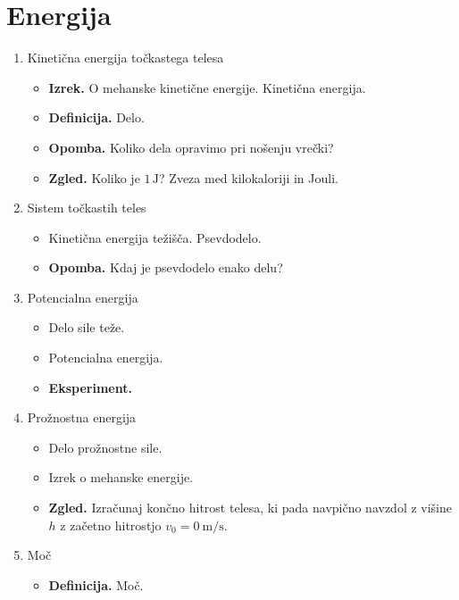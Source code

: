 \section{Energija}
\begin{enumerate}
    \item Kinetična energija točkastega telesa
    \begin{itemize}
        \item \textbf{Izrek.} O mehanske kinetične energije. Kinetična energija.
        \item \textbf{Definicija.} Delo.
        \item \textbf{Opomba.} Koliko dela opravimo pri nošenju vrečki?
        \item \textbf{Zgled.} Koliko je \(1\, \text{J}\)? Zveza med kilokaloriji in Jouli.
    \end{itemize}

    \item Sistem točkastih teles
    \begin{itemize}
        \item Kinetična energija težišča. Psevdodelo.
        \item \textbf{Opomba.} Kdaj je psevdodelo enako delu?
    \end{itemize}

    \item Potencialna energija
    \begin{itemize}
        \item Delo sile teže.
        \item Potencialna energija. 
        \item \textbf{Eksperiment.} \todo{}
    \end{itemize}

    \item Prožnostna energija
    \begin{itemize}
        \item Delo prožnostne sile.
        \item Izrek o mehanske energije.
        \item \textbf{Zgled.} Izračunaj končno hitrost telesa, ki pada navpično navzdol z višine \(h\) z začetno hitrostjo \(v_0 = 0 \ \text{m/s}\).
    \end{itemize}

    \item Moč
    \begin{itemize}
        \item \textbf{Definicija.} Moč.
    \end{itemize}
\end{enumerate}

